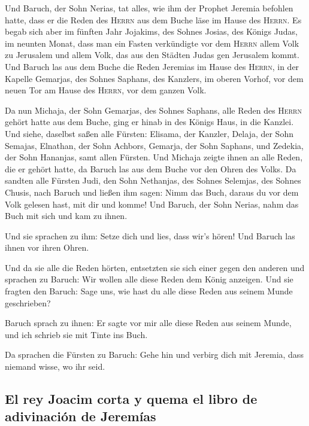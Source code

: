  Und Baruch, der Sohn Nerias, tat alles, wie ihm der
Prophet Jeremia befohlen hatte, dass er die Reden des \textsc{Herrn} aus
dem Buche läse im Hause des \textsc{Herrn}.  Es begab sich
aber im fünften Jahr Jojakims, des Sohnes Josias, des Königs Judas, im
neunten Monat, dass man ein Fasten verkündigte vor dem \textsc{Herrn}
allem Volk zu Jerusalem und allem Volk, das aus den Städten Judas gen
Jerusalem kommt.  Und Baruch las aus dem Buche die Reden
Jeremias im Hause des \textsc{Herrn}, in der Kapelle Gemarjas, des
Sohnes Saphans, des Kanzlers, im oberen Vorhof, vor dem neuen Tor am
Hause des \textsc{Herrn}, vor dem ganzen Volk.

 Da nun Michaja, der Sohn Gemarjas, des Sohnes Saphans,
alle Reden des \textsc{Herrn} gehört hatte aus dem Buche,
 ging er hinab in des Königs Haus, in die Kanzlei. Und
siehe, daselbst saßen alle Fürsten: Elisama, der Kanzler, Delaja, der
Sohn Semajas, Elnathan, der Sohn Achbors, Gemarja, der Sohn Saphans, und
Zedekia, der Sohn Hananjas, samt allen Fürsten.  Und
Michaja zeigte ihnen an alle Reden, die er gehört hatte, da Baruch las
aus dem Buche vor den Ohren des Volks.  Da sandten alle
Fürsten Judi, den Sohn Nethanjas, des Sohnes Selemjas, des Sohnes
Chusis, nach Baruch und ließen ihm sagen: Nimm das Buch, daraus du vor
dem Volk gelesen hast, mit dir und komme! Und Baruch, der Sohn Nerias,
nahm das Buch mit sich und kam zu ihnen.

 Und sie sprachen zu ihm: Setze dich und lies, dass wir's
hören! Und Baruch las ihnen vor ihren Ohren.

 Und da sie alle die Reden hörten, entsetzten sie sich
einer gegen den anderen und sprachen zu Baruch: Wir wollen alle diese
Reden dem König anzeigen.  Und sie fragten den Baruch:
Sage uns, wie hast du alle diese Reden aus seinem Munde geschrieben?

 Baruch sprach zu ihnen: Er sagte vor mir alle diese
Reden aus seinem Munde, und ich schrieb sie mit Tinte ins Buch.

 Da sprachen die Fürsten zu Baruch: Gehe hin und verbirg
dich mit Jeremia, dass niemand wisse, wo ihr seid.

\hypertarget{el-rey-joacim-corta-y-quema-el-libro-de-adivinaciuxf3n-de-jeremuxedas}{%
\subsection{El rey Joacim corta y quema el libro de adivinación de
Jeremías}\label{el-rey-joacim-corta-y-quema-el-libro-de-adivinaciuxf3n-de-jeremuxedas}}

